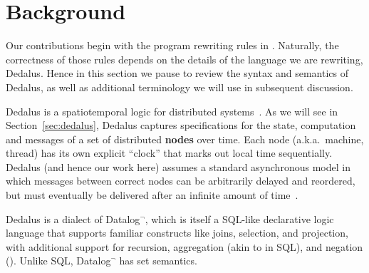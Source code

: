 \section{Background}
\label{sec:background}

Our contributions begin with the program rewriting rules in .
Naturally, the correctness of those rules depends on the details of the language we are rewriting, Dedalus.
Hence in this section we pause to review the syntax and semantics of Dedalus, as well as additional terminology we will use in subsequent discussion.

Dedalus is a spatiotemporal logic for distributed systems~\cite{dedalus}.
As we will see in Section~\ref{sec:dedalus}, Dedalus captures specifications for the state, computation and messages of
a set of distributed \textbf{nodes} over time. Each node (a.k.a.\ machine, thread) has its own explicit ``clock'' that marks out local time sequentially.
Dedalus (and hence our work here) assumes a standard asynchronous model 
in which messages between correct nodes can be arbitrarily delayed and reordered, but must eventually be delivered after an infinite amount of time~\cite{dwork1988consensus}.


Dedalus is a dialect of Datalog$^\neg$, which is itself a SQL-like declarative logic language that supports familiar constructs like joins, selection, and projection, with additional support for recursion, aggregation (akin to  in SQL), and negation (). Unlike SQL, Datalog$^\neg$ has set semantics.


